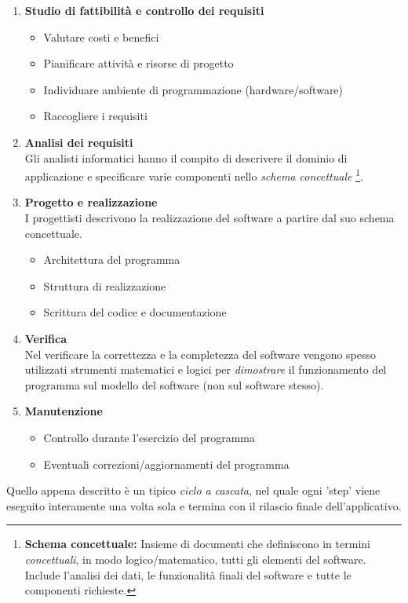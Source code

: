 \begin{enumerate}
	\item \textbf{Studio di fattibilità e controllo dei requisiti}
		\begin{itemize}
			\item Valutare costi e benefici
			\item Pianificare attività e risorse di progetto
			\item Individuare ambiente di programmazione (hardware/software)
			\item Raccogliere i requisiti
		\end{itemize}
	\item \textbf{Analisi dei requisiti} \hfill \\
		Gli analisti informatici hanno il compito di descrivere il dominio di applicazione e specificare varie componenti nello \textit{schema concettuale}
		\footnote{\textbf{Schema concettuale:} Insieme di documenti che definiscono in termini \textit{concettuali}, in modo logico/matematico, tutti gli elementi del software. 
		Include l'analisi dei dati, le funzionalità finali del software e tutte le componenti richieste.}.
	\item \textbf{Progetto e realizzazione} \hfill \\
		I progettisti descrivono la realizzazione del software a partire dal suo schema concettuale.
		\begin{itemize}
			\item Architettura del programma
			\item Struttura di realizzazione
			\item Scrittura del codice e documentazione
		\end{itemize}
	\item \textbf{Verifica} \hfill \\
		Nel verificare la correttezza e la completezza del software vengono spesso utilizzati strumenti matematici e logici	per \textit{dimostrare} il funzionamento del programma sul modello del software (non sul software stesso).
	\item \textbf{Manutenzione}
		\begin{itemize}
			\item Controllo durante l'esercizio del programma
			\item Eventuali correzioni/aggiornamenti del programma
		\end{itemize}
\end{enumerate}
Quello appena descritto è un tipico \textit{ciclo a cascata}, nel quale ogni 'step' viene eseguito interamente una volta sola e termina con il rilascio finale dell'applicativo.\\
